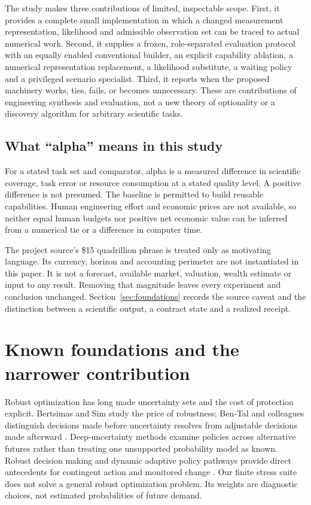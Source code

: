 \documentclass[11pt,letterpaper]{article}
\begin{document}
The study makes three contributions of limited, inspectable scope. First, it provides a complete small implementation in which a changed measurement representation, likelihood and admissible observation set can be traced to actual numerical work. Second, it supplies a frozen, role-separated evaluation protocol with an equally enabled conventional builder, an explicit capability ablation, a numerical representation replacement, a likelihood substitute, a waiting policy and a privileged scenario specialist. Third, it reports when the proposed machinery works, ties, fails, or becomes unnecessary. These are contributions of engineering synthesis and evaluation, not a new theory of optionality or a discovery algorithm for arbitrary scientific tasks.

\subsection{What ``alpha'' means in this study}

For a stated task set and comparator, alpha is a measured difference in scientific coverage, task error or resource consumption at a stated quality level. A positive difference is not presumed. The baseline is permitted to build reusable capabilities. Human engineering effort and economic prices are not available, so neither equal human budgets nor positive net economic value can be inferred from a numerical tie or a difference in computer time.

The project source's \$15 quadrillion phrase is treated only as motivating language. Its currency, horizon and accounting perimeter are not instantiated in this paper. It is not a forecast, available market, valuation, wealth estimate or input to any result. Removing that magnitude leaves every experiment and conclusion unchanged. Section~\ref{sec:foundations} records the source caveat and the distinction between a scientific output, a contract state and a realized receipt.

\section{Known foundations and the narrower contribution}

Robust optimization has long made uncertainty sets and the cost of protection explicit. Bertsimas and Sim study the price of robustness; Ben-Tal and colleagues distinguish decisions made before uncertainty resolves from adjustable decisions made afterward \citep{bertsimas2004price,bental2004adjustable}. Deep-uncertainty methods examine policies across alternative futures rather than treating one unsupported probability model as known. Robust decision making and dynamic adaptive policy pathways provide direct antecedents for contingent action and monitored change \citep{lempert2003shaping,haasnoot2013pathways}. Our finite stress suite does not solve a general robust optimization problem. Its weights are diagnostic choices, not estimated probabilities of future demand.
\end{document}
